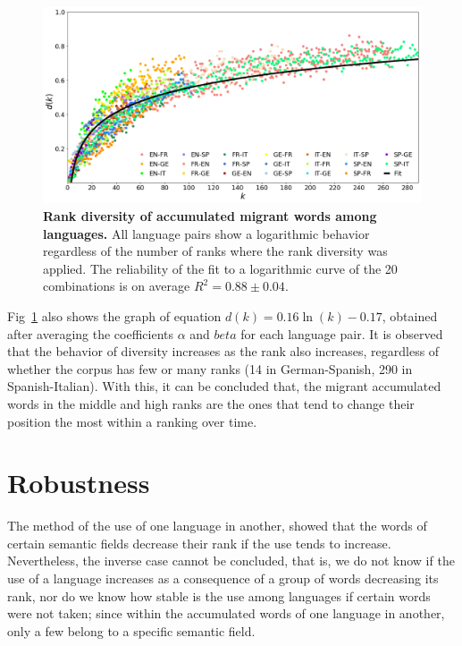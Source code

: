 \documentclass[10pt,letterpaper]{article} %
\begin{document}
\begin{figure}[!h]
	\begin{adjustwidth}{-2.5cm}{1cm}
		\centering
		\includegraphics[scale=.38]{DR_art.png}
		\caption{{\bf Rank diversity of accumulated migrant words among languages.} All language pairs show a logarithmic behavior regardless of the number of ranks where the rank diversity was applied. The reliability of the fit to a logarithmic curve of the 20 combinations is on average $R^{2}= 0.88 \pm 0.04$.}
		\label{fig.DR_art}
	\end{adjustwidth}
\end{figure}


Fig~\ref{fig.DR_art} also shows the graph of equation $d(k) = 0.16\ln(k) - 0.17$, obtained after averaging the coefficients $\alpha$ and $beta$ for each language pair. It is observed that the behavior of diversity increases as the rank also increases, regardless of whether the corpus has few or many ranks (14 in German-Spanish, 290 in Spanish-Italian). With this, it can be concluded that, the migrant accumulated words in the middle and high ranks are the ones that tend to change their position the most within a ranking over time.



\section*{Robustness} %

The method of the use of one language in another, showed that the words of certain semantic fields decrease their rank if the use tends to increase. Nevertheless, the inverse case cannot be concluded, that is, we do not know if the use of a language increases as a consequence of a group of words decreasing its rank, nor do we know how stable is the use among languages if certain words were not taken; since within the accumulated words of one language in another, only a few belong to a specific semantic field.
\end{document}
